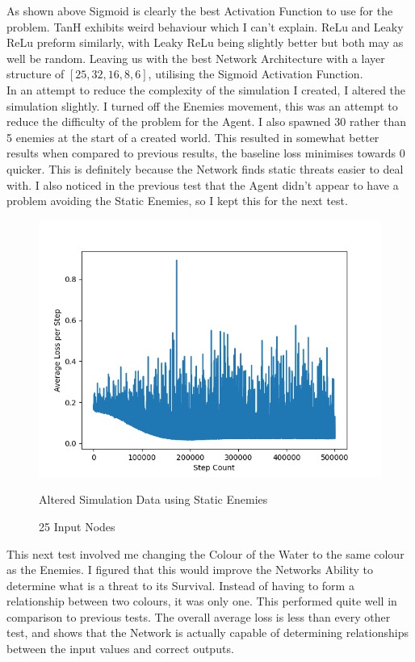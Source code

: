 \begin{flushleft}
        As shown above Sigmoid is clearly the best Activation Function to use for the problem. TanH exhibits weird behaviour which I can't explain. 
        ReLu and Leaky ReLu preform similarly, with Leaky ReLu being slightly better but both may as well be random. Leaving us with the best Network 
        Architecture with a layer structure of $[25,32,16,8,6]$, utilising the Sigmoid Activation Function. \\
        \vspace{0.2cm}
        In an attempt to reduce the complexity of the simulation I created, I altered the simulation slightly. I turned off the Enemies movement,
        this was an attempt to reduce the difficulty of the problem for the Agent. I also spawned 30 rather than 5 enemies at the start of a created
        world. This resulted in somewhat better results when compared to previous results, the baseline loss minimises towards 0 quicker. This is 
        definitely because the Network finds static threats easier to deal with. I also noticed in the previous test that the Agent didn't appear 
        to have a problem avoiding the Static Enemies, so I kept this for the next test.

        \begin{figure}[H]
            \centering
            \includegraphics[width=12cm]{Images/Evaluation/StaticEnemiesExtra.png}
            \caption*{Altered Simulation Data using Static Enemies}
            \caption*{25 Input Nodes}
        \end{figure}

        This next test involved me changing the Colour of the Water to the same colour as the Enemies. I figured that this would improve the Networks
        Ability to determine what is a threat to its Survival. Instead of having to form a relationship between two colours, it was only one. This
        performed quite well in comparison to previous tests. The overall average loss is less than every other test, and shows that the Network is 
        actually capable of determining relationships between the input values and correct outputs.


\end{flushleft}
